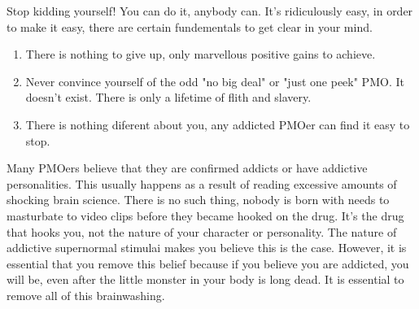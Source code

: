 \documentclass[easypeasy.tex]{subfiles}
\begin{document}
Stop kidding yourself! You can do it, anybody can. It's ridiculously easy, in order to make it easy, there are certain fundementals to get clear in your mind.

\begin{enumerate}
  \item There is nothing to give up, only marvellous positive gains to achieve.
  \item Never convince yourself of the odd "no big deal" or "just one peek" PMO. It doesn't exist. There is only a lifetime of flith and slavery.
  \item There is nothing diferent about you, any addicted PMOer can find it easy to stop.
\end{enumerate}

Many PMOers believe that they are confirmed addicts or have addictive personalities. This usually happens as a result of reading excessive amounts of shocking brain science. There is no such thing, nobody is born with needs to masturbate to video clips before they became hooked on the drug. It's the drug that hooks you, not the nature of your character or personality. The nature of addictive supernormal stimulai makes you believe this is the case. However, it is essential that you remove this belief because if you believe you are addicted, you will be, even after the little monster in your body is long dead. It is essential to remove all of this brainwashing.
\end{document}

